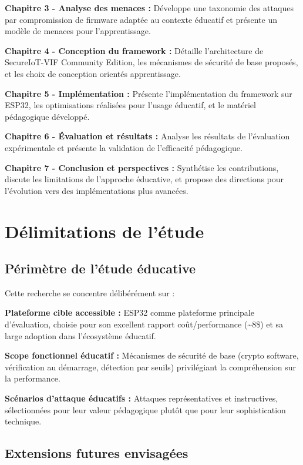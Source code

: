 \textbf{Chapitre 3 - Analyse des menaces :} Développe une taxonomie des attaques par compromission de firmware adaptée au contexte éducatif et présente un modèle de menaces pour l'apprentissage.

\textbf{Chapitre 4 - Conception du framework :} Détaille l'architecture de SecureIoT-VIF Community Edition, les mécanismes de sécurité de base proposés, et les choix de conception orientés apprentissage.

\textbf{Chapitre 5 - Implémentation :} Présente l'implémentation du framework sur ESP32, les optimisations réalisées pour l'usage éducatif, et le matériel pédagogique développé.

\textbf{Chapitre 6 - Évaluation et résultats :} Analyse les résultats de l'évaluation expérimentale et présente la validation de l'efficacité pédagogique.

\textbf{Chapitre 7 - Conclusion et perspectives :} Synthétise les contributions, discute les limitations de l'approche éducative, et propose des directions pour l'évolution vers des implémentations plus avancées.

\section{Délimitations de l'étude}

\subsection{Périmètre de l'étude éducative}

Cette recherche se concentre délibérément sur :

\textbf{Plateforme cible accessible :} ESP32 comme plateforme principale d'évaluation, choisie pour son excellent rapport coût/performance (\textasciitilde 8\$) et sa large adoption dans l'écosystème éducatif.

\textbf{Scope fonctionnel éducatif :} Mécanismes de sécurité de base (crypto software, vérification au démarrage, détection par seuils) privilégiant la compréhension sur la performance.

\textbf{Scénarios d'attaque éducatifs :} Attaques représentatives et instructives, sélectionnées pour leur valeur pédagogique plutôt que pour leur sophistication technique.

\subsection{Extensions futures envisagées}

